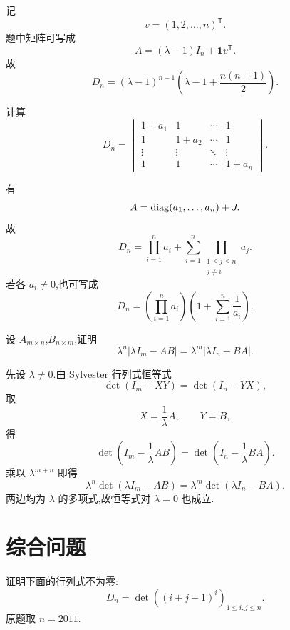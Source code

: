 \begin{solution}
记
\[
v=(1,2,\ldots,n)^{\mathsf T}.
\]
题中矩阵可写成
\[
A=(\lambda-1)I_n+\boldsymbol{1}v^{\mathsf T}.
\]
故
\[
\boxed{
D_n
=
(\lambda-1)^{n-1}
\left(
\lambda-1+\dfrac{n(n+1)}{2}
\right)
}.
\]
\end{solution}


\begin{example}
计算
\[
D_n=
\begin{vmatrix}
1+a_1&1&\cdots&1\\
1&1+a_2&\cdots&1\\
\vdots&\vdots&\ddots&\vdots\\
1&1&\cdots&1+a_n
\end{vmatrix}.
\]
\end{example}
\exampleblank

\begin{solution}
有
\[
A=\operatorname{diag}(a_1,\ldots,a_n)+J.
\]
故
\[
\boxed{
D_n
=
\prod\limits_{i=1}^{n}a_i
+
\sum\limits_{i=1}^{n}
\prod_{\substack{1\leq j\leq n\\j\neq i}}a_j
}.
\]
若各 $a_i\neq0$,也可写成
\[
D_n
=
\left(\prod\limits_{i=1}^{n}a_i\right)
\left(
1+\sum\limits_{i=1}^{n}\dfrac{1}{a_i}
\right).
\]
\end{solution}


\begin{example}[\markstar]
设 $A_{m\times n}$,$B_{n\times m}$,证明
\[
\lambda^n
\left|\lambda I_m-AB\right|
=
\lambda^m
\left|\lambda I_n-BA\right|.
\]
\end{example}
\exampleblank

\begin{solution}
先设 $\lambda\neq0$.由 Sylvester 行列式恒等式
\[
\det(I_m-XY)=\det(I_n-YX),
\]
取
\[
X=\dfrac{1}{\lambda}A,\qquad Y=B,
\]
得
\[
\det\left(I_m-\dfrac{1}{\lambda}AB\right)
=
\det\left(I_n-\dfrac{1}{\lambda}BA\right).
\]
乘以 $\lambda^{m+n}$ 即得
\[
\lambda^n
\det(\lambda I_m-AB)
=
\lambda^m
\det(\lambda I_n-BA).
\]
两边均为 $\lambda$ 的多项式,故恒等式对 $\lambda=0$ 也成立.
\end{solution}


\newpage

\section{综合问题}

\begin{example}
证明下面的行列式不为零:
\[
D_n=
\det\left((i+j-1)^i\right)_{1\leq i,j\leq n}.
\]
原题取 $n=2011$.
\end{example}
\exampleblank


